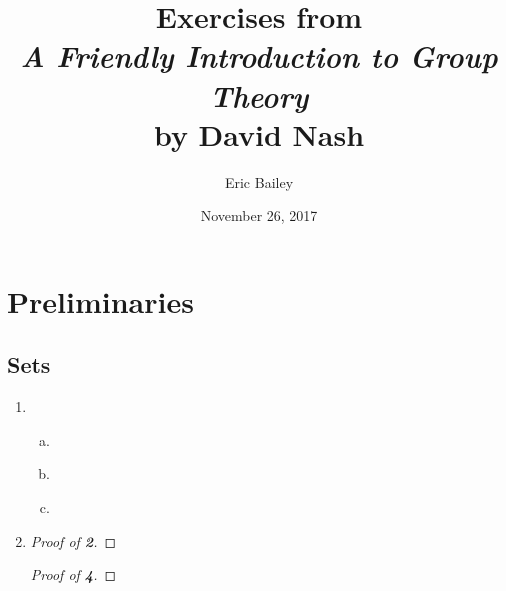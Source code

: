 \documentclass[12pt]{amsart}
\title{%
  Exercises from \\
  {\sl A Friendly Introduction to Group Theory} \\
  by David Nash%
}
\author{Eric Bailey}
\date{November 26, 2017}
\def\Circled#1{{\Large \textcircled{\small \bf #1}}}
\def\exercise#1#2{%
  \inputminted{gap}{gap/#1/#2.g}%
  \inputminted{gap}{answer/#1/#2.txt}%
}
\def\inputproof#1#2{%
  \begin{proof}[Proof of \Circled{#2}]
    
  \end{proof}%
}
\begin{document}
\maketitle
\tableofcontents
\newpage

\section{Preliminaries}

\subsection{Sets}

\begin{enumerate}[{\bf 1.}]
\item
  \begin{enumerate}[(a)]
  \item \exercise{1.1}{1a} \newpage
  \item \exercise{1.1}{1b}
  \item \exercise{1.1}{1c}
  \end{enumerate} \newpage

\item
  \begin{sideways}
    \begin{minipage}{\textheight}
      \inputproof{1.1}{2}
      \inputproof{1.1}{4}
    \end{minipage}
  \end{sideways}
\end{enumerate}
\end{document}
